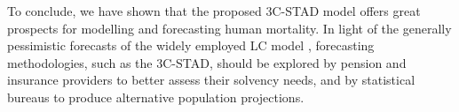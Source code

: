 \documentclass[11pt, a4paper]{article}
\begin{document}
To conclude, we have shown that the proposed 3C-STAD model offers great prospects for modelling and forecasting human mortality. In light of the generally pessimistic forecasts of the widely employed LC model \citep{li2013extending,seligman2016convergence}, forecasting methodologies, such as the 3C-STAD, should be explored by pension and insurance providers to better assess their solvency needs, and by statistical bureaus to produce alternative population projections. 


\small


	
\end{document}
